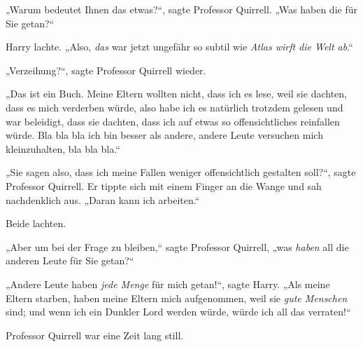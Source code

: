 „Warum bedeutet Ihnen das etwas?“, sagte Professor Quirrell. „Was haben die für Sie getan?“

Harry lachte. „Also, \emph{das} war jetzt ungefähr so subtil wie \emph{Atlas wirft die Welt ab}.“

„Verzeihung?“, sagte Professor Quirrell wieder.

„Das ist ein Buch. Meine Eltern wollten nicht, dass ich es lese, weil sie dachten, dass es mich verderben würde, also habe ich es natürlich trotzdem gelesen und war beleidigt, dass sie dachten, dass ich auf etwas so offensichtliches reinfallen würde. Bla bla bla ich bin besser als andere, andere Leute versuchen mich kleinzuhalten, bla bla bla.“

„Sie sagen also, dass ich meine Fallen weniger offensichtlich gestalten soll?“, sagte Professor Quirrell. Er tippte sich mit einem Finger an die Wange und sah nachdenklich aus. „Daran kann ich arbeiten.“

Beide lachten.

„Aber um bei der Frage zu bleiben,“ sagte Professor Quirrell, „was \emph{haben} all die anderen Leute für Sie getan?“

„Andere Leute haben \emph{jede Menge} für mich getan!“, sagte Harry. „Als meine Eltern starben, haben meine Eltern mich aufgenommen, weil sie \emph{gute Menschen} sind; und wenn ich ein Dunkler Lord werden würde, würde ich all das verraten!“

Professor Quirrell war eine Zeit lang still.

